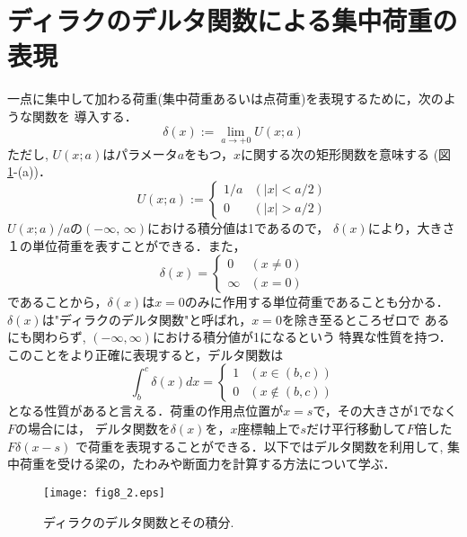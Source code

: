 \documentclass[10pt,a4j]{jarticle}
\begin{document}
\section{ディラクのデルタ関数による集中荷重の表現}
一点に集中して加わる荷重(集中荷重あるいは点荷重)を表現するために，次のような関数を
導入する．
\begin{equation}
	\delta  (x) := \lim _ {a\rightarrow +0} U(x;a)
	\label{eqn:delta_x}
\end{equation}
ただし, $U(x;a)$はパラメータ$a$をもつ，$x$に関する次の矩形関数を意味する
(図\ref{fig:fig8_2}-(a))．
\begin{equation}
	U(x;a):=\left\{
		\begin{array}{cc}
			1/a & \left(\left| x \right| < a/2 \right) \\
			0 & \left(\left| x \right| > a/2 \right) 
		\end{array}
		\right.
	\label{eqn:def_U}
\end{equation}
$U(x;a)/a$の$(-\infty,\,\infty)$における積分値は1であるので，
$\delta(x)$により，大きさ１の単位荷重を表すことができる．また，
\begin{equation}
	\delta(x)=\left\{
		\begin{array}{cc}
			0 & \left(x\neq 0\right) \\
			\infty & \left(x=0 \right) 
		\end{array}
		\right.
	\label{eqn:delta_x_val}
\end{equation}
であることから，$\delta(x)$は$x=0$のみに作用する単位荷重であることも分かる．
$\delta(x)$は"ディラクのデルタ関数"と呼ばれ，$x=0$を除き至るところゼロで
あるにも関わらず, $(-\infty,\infty)$における積分値が1になるという
特異な性質を持つ．このことをより正確に表現すると，デルタ関数は
\begin{equation}
	\int _b^c \delta(x) dx = \left\{
	\begin{array}{cc}
		1 & \left( x \in (b,c)\right) \\ 
		0 & \left( x \notin (b,c)\right)
	\end{array}
	\label{eqn:idelta_ab}
	\right.
\end{equation}
となる性質があると言える．荷重の作用点位置が$x=s$で，その大きさが1でなく$F$の場合には，
デルタ関数を$\delta(x)$を，$x$座標軸上で$s$だけ平行移動して$F$倍した$F\delta (x-s)$
で荷重を表現することができる．以下ではデルタ関数を利用して, 集中荷重を受ける梁の，たわみや断面力を計算する方法について学ぶ．
\begin{figure}
	\begin{center}
	\texttt{[image: fig8\_2.eps]} 
	\end{center}
	\caption{
		ディラクのデルタ関数とその積分.
	 } 
	\label{fig:fig8_2}
\end{figure}
\end{document}
